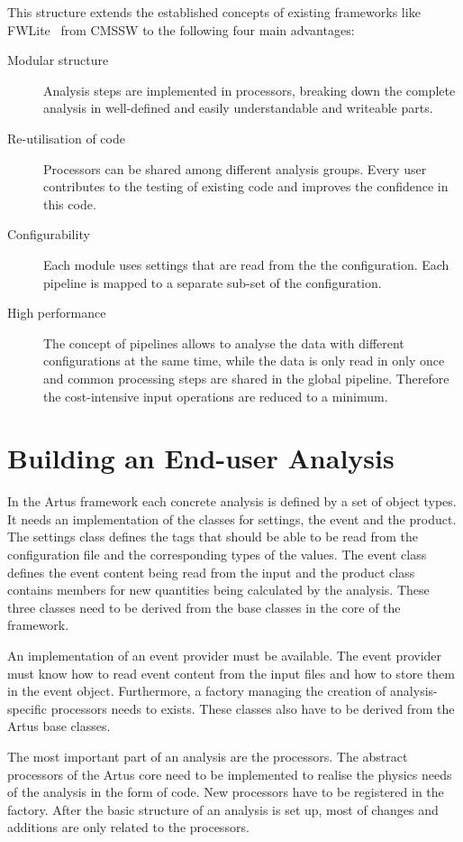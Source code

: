 \documentclass[3p]{elsarticle}
\begin{document}
This structure extends the established concepts of existing frameworks like FWLite~\cite{FWLite} from CMSSW to the following four main advantages:
\begin{description}
\item[Modular structure] Analysis steps are implemented in processors, breaking down the complete analysis in well-defined and easily understandable and writeable parts.
\item[Re-utilisation of code] Processors can be shared among different analysis groups. Every user contributes to the testing of existing code and improves the confidence in this code.
\item[Configurability] Each module uses settings that are read from the the configuration. Each pipeline is mapped to a separate sub-set of the configuration.
\item[High performance] The concept of pipelines allows to analyse the data with different configurations at the same time, while the data is only read in only once and common processing steps are shared in the global pipeline. Therefore the cost-intensive input operations are reduced to a minimum.
\end{description}


\section{Building an End-user Analysis \label{section_artus_analysis}}

In the Artus framework each concrete analysis is defined by a set of object types. It needs an implementation of the classes for settings, the event and the product. The settings class defines the tags that should be able to be read from the configuration file and the corresponding types of the values. The event class defines the event content being read from the input and the product class contains members for new quantities being calculated by the analysis. These three classes need to be derived from the base classes in the core of the framework.

An implementation of an event provider must be available. The event provider must know how to read event content from the input files and how to store them in the event object. Furthermore, a factory managing the creation of analysis-specific processors needs to exists. These classes also have to be derived from the Artus base classes.

The most important part of an analysis are the processors. The abstract processors of the Artus core need to be implemented to realise the physics needs of the analysis in the form of code. New processors have to be registered in the factory. After the basic structure of an analysis is set up, most of changes and additions are only related to the processors.
\end{document}
